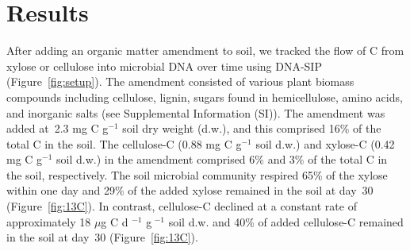 \section{Results}
After adding an organic matter amendment to soil, we tracked the flow of C from
xylose or cellulose into microbial DNA over time using DNA-SIP
(Figure~\ref{fig:setup}). The amendment consisted of various plant biomass
compounds including cellulose, lignin, sugars found in hemicellulose, amino
acids, and inorganic salts (see Supplemental Information (SI)). The amendment
was added at~2.3 mg C g$^{-1}$ soil dry weight (d.w.), and this comprised 16\%
of the total C in the soil. The cellulose-C (0.88 mg C g$^{-1}$ soil d.w.) and
xylose-C (0.42 mg C g$^{-1}$ soil d.w.) in the amendment comprised 6\% and 3\%
of the total C in the soil, respectively. The soil microbial community respired
65\% of the xylose within one day and 29\% of the added xylose remained in the
soil at day~30 (Figure~\ref{fig:13C}). In contrast, cellulose-C declined at
a constant rate of approximately 18 $\mu$g C d $^{-1}$ g $^{-1}$ soil d.w. and
40\% of added cellulose-C remained in the soil at day~30
(Figure~\ref{fig:13C}).

